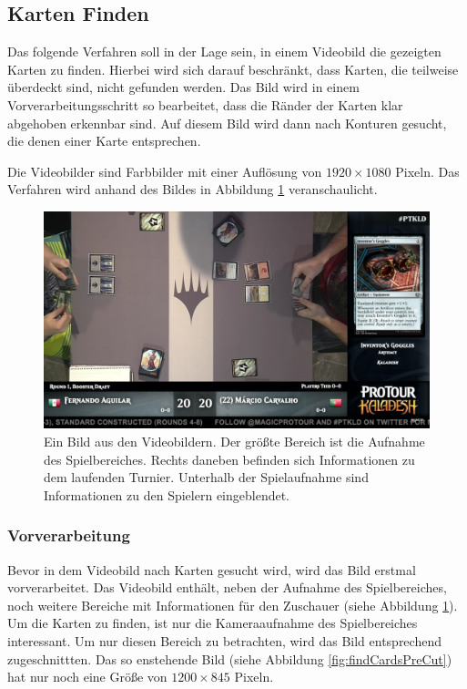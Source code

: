 \subsection{Karten Finden}
\label{sec:kartenFinden}

Das folgende Verfahren soll in der Lage sein, in einem Videobild die gezeigten Karten zu finden.
Hierbei wird sich darauf beschränkt, dass Karten, die teilweise überdeckt sind, nicht gefunden werden.
Das Bild wird in einem Vorverarbeitungsschritt so bearbeitet, dass die Ränder der Karten klar abgehoben erkennbar sind. Auf diesem Bild wird dann nach Konturen gesucht, die denen einer Karte entsprechen.

Die Videobilder sind Farbbilder mit einer Auflösung von $1920 \times 1080$ Pixeln.
Das Verfahren wird anhand des Bildes in Abbildung \ref{fig:findCardsSample} veranschaulicht.

\begin{figure}[h]
    \centering
		\includegraphics[scale=0.1]{bilder/findCardsSample.png}
    	\caption{Ein Bild aus den Videobildern. Der größte Bereich ist die Aufnahme des Spielbereiches. Rechts daneben befinden sich Informationen zu dem laufenden Turnier. Unterhalb der Spielaufnahme sind Informationen zu den Spielern eingeblendet. }
\label{fig:findCardsSample}
\end{figure}

\subsubsection{Vorverarbeitung}

Bevor in dem Videobild nach Karten gesucht wird, wird das Bild erstmal vorverarbeitet. 
Das Videobild enthält, neben der Aufnahme des Spielbereiches, noch weitere Bereiche mit Informationen für den Zuschauer (siehe Abbildung \ref{fig:findCardsSample}). Um die Karten zu finden, ist nur die Kameraaufnahme des Spielbereiches interessant.
Um nur diesen Bereich zu betrachten, wird das Bild entsprechend zugeschnittten. Das so enstehende Bild (siehe Abbildung \ref{fig:findCardsPreCut}) hat nur noch eine Größe von $1200 \times 845$ Pixeln.


